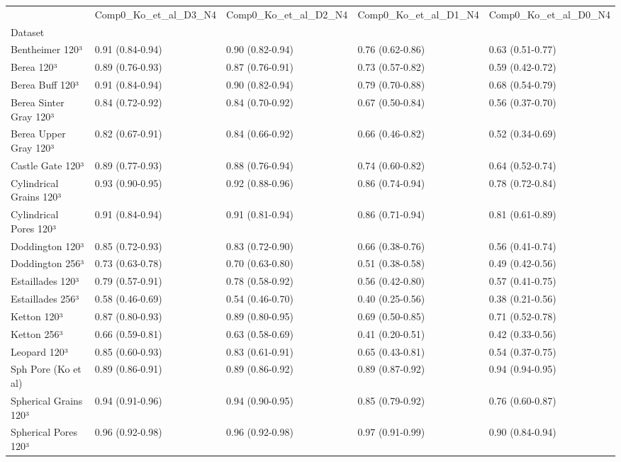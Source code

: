 \begin{tabular}{lllll}
\toprule
 & Comp0_Ko_et_al_D3_N4 & Comp0_Ko_et_al_D2_N4 & Comp0_Ko_et_al_D1_N4 & Comp0_Ko_et_al_D0_N4 \\
Dataset &  &  &  &  \\
\midrule
Bentheimer 120³ & 0.91 (0.84-0.94) & 0.90 (0.82-0.94) & 0.76 (0.62-0.86) & 0.63 (0.51-0.77) \\
Berea 120³ & 0.89 (0.76-0.93) & 0.87 (0.76-0.91) & 0.73 (0.57-0.82) & 0.59 (0.42-0.72) \\
Berea Buff 120³ & 0.91 (0.84-0.94) & 0.90 (0.82-0.94) & 0.79 (0.70-0.88) & 0.68 (0.54-0.79) \\
Berea Sinter Gray 120³ & 0.84 (0.72-0.92) & 0.84 (0.70-0.92) & 0.67 (0.50-0.84) & 0.56 (0.37-0.70) \\
Berea Upper Gray 120³ & 0.82 (0.67-0.91) & 0.84 (0.66-0.92) & 0.66 (0.46-0.82) & 0.52 (0.34-0.69) \\
Castle Gate 120³ & 0.89 (0.77-0.93) & 0.88 (0.76-0.94) & 0.74 (0.60-0.82) & 0.64 (0.52-0.74) \\
Cylindrical Grains 120³ & 0.93 (0.90-0.95) & 0.92 (0.88-0.96) & 0.86 (0.74-0.94) & 0.78 (0.72-0.84) \\
Cylindrical Pores 120³ & 0.91 (0.84-0.94) & 0.91 (0.81-0.94) & 0.86 (0.71-0.94) & 0.81 (0.61-0.89) \\
Doddington 120³ & 0.85 (0.72-0.93) & 0.83 (0.72-0.90) & 0.66 (0.38-0.76) & 0.56 (0.41-0.74) \\
Doddington 256³ & 0.73 (0.63-0.78) & 0.70 (0.63-0.80) & 0.51 (0.38-0.58) & 0.49 (0.42-0.56) \\
Estaillades 120³ & 0.79 (0.57-0.91) & 0.78 (0.58-0.92) & 0.56 (0.42-0.80) & 0.57 (0.41-0.75) \\
Estaillades 256³ & 0.58 (0.46-0.69) & 0.54 (0.46-0.70) & 0.40 (0.25-0.56) & 0.38 (0.21-0.56) \\
Ketton 120³ & 0.87 (0.80-0.93) & 0.89 (0.80-0.95) & 0.69 (0.50-0.85) & 0.71 (0.52-0.78) \\
Ketton 256³ & 0.66 (0.59-0.81) & 0.63 (0.58-0.69) & 0.41 (0.20-0.51) & 0.42 (0.33-0.56) \\
Leopard 120³ & 0.85 (0.60-0.93) & 0.83 (0.61-0.91) & 0.65 (0.43-0.81) & 0.54 (0.37-0.75) \\
Sph Pore (Ko et al) & 0.89 (0.86-0.91) & 0.89 (0.86-0.92) & 0.89 (0.87-0.92) & 0.94 (0.94-0.95) \\
Spherical Grains 120³ & 0.94 (0.91-0.96) & 0.94 (0.90-0.95) & 0.85 (0.79-0.92) & 0.76 (0.60-0.87) \\
Spherical Pores 120³ & 0.96 (0.92-0.98) & 0.96 (0.92-0.98) & 0.97 (0.91-0.99) & 0.90 (0.84-0.94) \\
\bottomrule
\end{tabular}
